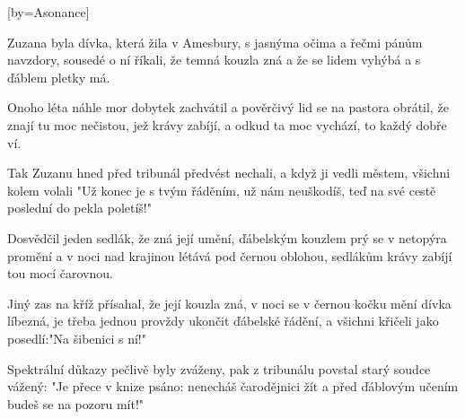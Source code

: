 [by={Asonance}]

\beginverse{}
Zuzana byla dívka, která žila v Amesbury,
s jasnýma očima a řečmi pánům navzdory,
sousedé o ní říkali, že temná kouzla zná
a že se lidem vyhýbá a s ďáblem pletky má.
\endverse{}

\beginverse{}
\chordsoff{}
Onoho léta náhle mor dobytek zachvátil
a pověrčivý lid se na pastora obrátil,
že znají tu moc nečistou, jež krávy zabíjí,
a odkud ta moc vychází, to každý dobře ví.
\chordson{}
\endverse{}

\beginverse{}
\chordsoff{}
Tak Zuzanu hned před tribunál předvést nechali,
a když ji vedli městem, všichni kolem volali
"Už konec je s tvým řáděním, už nám neuškodíš,
teď na své cestě poslední do pekla poletíš!"
\chordson{}
\endverse{}

\beginverse{}
\chordsoff{}
Dosvědčil jeden sedlák, že zná její umění,
ďábelským kouzlem prý se v netopýra promění
a v noci nad krajinou létává pod černou oblohou,
sedlákům krávy zabíjí tou mocí čarovnou.
\chordson{}
\endverse{}

\beginverse{}
\chordsoff{}
Jiný zas na kříž přísahal, že její kouzla zná,
v noci se v černou kočku mění dívka líbezná,
je třeba jednou provždy ukončit ďábelské řádění,
a všichni křičeli jako posedlí:"Na šibenici s ní!"
\chordson{}
\endverse{}

\beginverse{}
\chordsoff{}
Spektrální důkazy pečlivě byly zváženy,
pak z tribunálu povstal starý soudce vážený:
"Je přece v knize psáno: nenecháš čarodějnici žít
a před ďáblovým učením budeš se na pozoru mít!"
\chordson{}
\endverse{}

